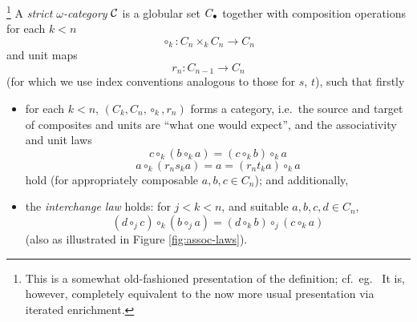\begin{definition}\footnote{This is a somewhat old-fashioned presentation of the definition; cf.\ eg.\ \cite{street:algebra-of-oriented-simplices}  It is, however, completely equivalent to the now more usual presentation via iterated enrichment.}
A \emph{strict $\omega$-category} $\mathcal{C}$ is a globular set $C_\bullet$ together with composition operations for each $k < n$
$$\circ_k \colon C_n \times_k C_n \to C_n$$
and unit maps
$$r_n \colon C_{n-1} \to C_n$$
(for which we use index conventions analogous to those for $s$, $t$),
 such that firstly
\begin{itemize}
\item for each $k < n$, $(C_k,C_n, \circ_k, r_n)$ forms a category, i.e.\ the source and target of composites and units are ``what one would expect'', and the associativity and unit laws
$$ c \circ_k (b \circ_k a) = (c \circ_k b) \circ_k a$$
$$ a \circ_k (r_n s_k a) = a = (r_n t_k a) \circ_k a$$
hold (for appropriately composable $a, b, c \in C_n$); and additionally,
\item the \emph{interchange law} holds: for $j < k < n$, and suitable $a,b,c,d \in C_n$,
$$ (d \circ_j c) \circ_k (b \circ_j a) = (d \circ_k b) \circ_j (c \circ_k a)$$
(also as illustrated in Figure \ref{fig:assoc-laws}). 
\end{itemize}
\end{definition}

